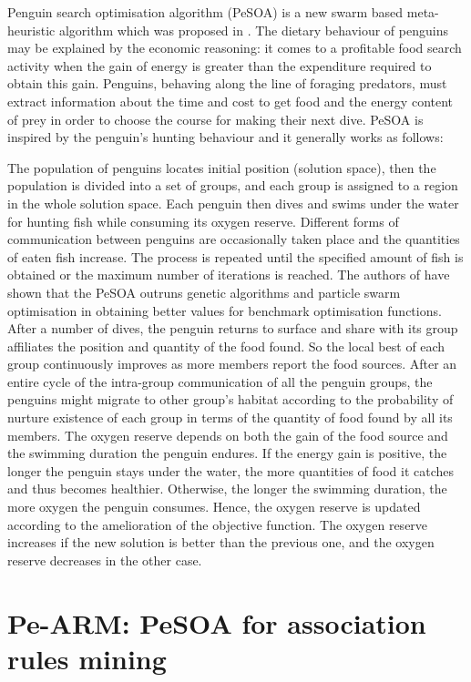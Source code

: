 \documentclass[preprint,12pt]{elsarticle}
\begin{document}
Penguin search optimisation algorithm (PeSOA) is a new swarm based meta-heuristic algorithm which was proposed in \cite{15}. The dietary behaviour of penguins may be explained by the economic reasoning: it comes to a profitable food search activity when the gain of energy is greater than the expenditure required to obtain this gain. Penguins, behaving along the line of foraging predators, must extract information about the time and cost to get food and the energy content of prey in order to choose the course for making their next dive.
 PeSOA is inspired by the penguin's hunting behaviour and it generally works as follows:
  
The population of penguins locates initial position (solution space), then the population is divided into a set of groups, and each group is assigned to a region in the whole solution space. Each penguin then dives and swims under the water for hunting fish while consuming its oxygen reserve. Different forms of communication between penguins are occasionally taken place and the quantities of eaten fish increase. The process is repeated until the specified amount of fish is obtained or the maximum number of iterations is reached. The authors of \cite{15} have shown that the PeSOA outruns genetic algorithms and particle swarm optimisation in obtaining better values for benchmark optimisation functions. 
After a number of dives, the penguin returns to surface and share with its group affiliates the position and quantity of the food found. So the local best of each group continuously
 improves as more members report the food sources. After an entire cycle of the intra-group communication of all the penguin groups, the penguins might migrate to other group's habitat according to the probability of nurture existence of each group in terms of the quantity of food found by all its members.
The oxygen reserve depends on both the gain of the food source and the swimming duration the penguin endures. If the energy gain is positive, the longer the penguin stays under the water, the more quantities of food it catches and thus becomes healthier. Otherwise, the longer the swimming duration, the more oxygen the penguin consumes. Hence, the oxygen reserve is updated according to the amelioration of the objective function. The oxygen reserve increases if the new solution is better than the previous one, and the oxygen reserve decreases in the other case.

\section{Pe-ARM: PeSOA for association rules mining}
\end{document}
